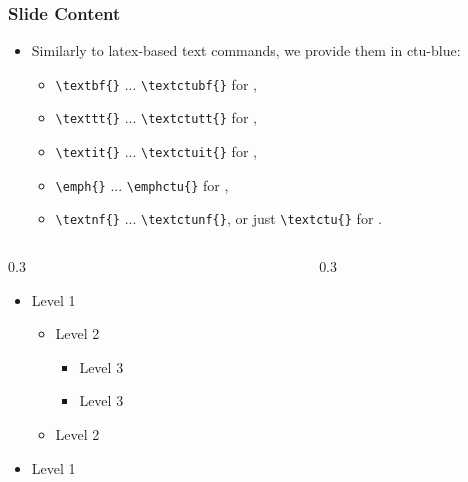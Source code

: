 \begin{frame}
    \frametitle{Slide Content}
    \begin{itemize}
        \item Similarly to latex-based text commands, we provide them in ctu-blue:
        \begin{itemize}
            \item {\tt \textbackslash textbf\{\}} ... {\tt \textbackslash textctubf\{\}} for ,
            \item {\tt \textbackslash texttt\{\}} ... {\tt \textbackslash textctutt\{\}} for ,
            \item {\tt \textbackslash textit\{\}} ... {\tt \textbackslash textctuit\{\}} for ,
            \item {\tt \textbackslash emph\{\}} ... {\tt \textbackslash emphctu\{\}} for ,
            \item {\tt \textbackslash textnf\{\}} ... {\tt \textbackslash textctunf\{\}}, or just {\tt \textbackslash textctu\{\}} for .
        \end{itemize}
    \end{itemize}
    \vspace{1em}
    \begin{columns}
        \begin{column}[]{0.3\textwidth}
            \begin{itemize}
                \item Level 1
                \begin{itemize}
                    \item Level 2
            	      \begin{itemize}
                        \item Level 3
                        \item Level 3
                    \end{itemize}
                    \item Level 2
        	    \end{itemize}
                \item Level 1   
           \end{itemize}
        \end{column}
        \begin{column}[]{0.3\textwidth}

\end{column}
\end{columns}
\end{frame}
